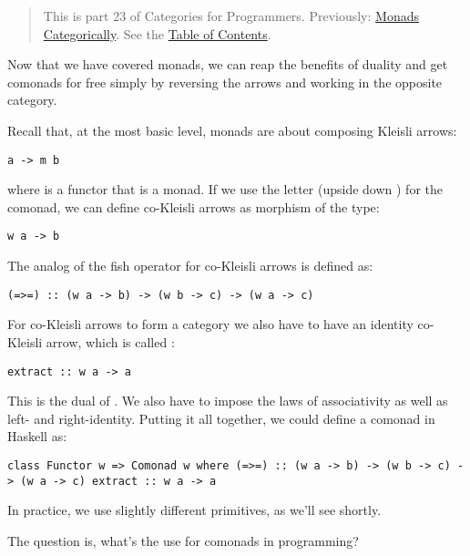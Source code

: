 \begin{quote}
This is part 23 of Categories for Programmers. Previously:
\href{https://bartoszmilewski.com/2016/12/27/monads-categorically/}{Monads
Categorically}. See the
\href{https://bartoszmilewski.com/2014/10/28/category-theory-for-programmers-the-preface/}{Table
of Contents}.
\end{quote}

Now that we have covered monads, we can reap the benefits of duality and
get comonads for free simply by reversing the arrows and working in the
opposite category.

Recall that, at the most basic level, monads are about composing Kleisli
arrows:

\begin{verbatim}
a -> m b
\end{verbatim}

where  is a functor that is a monad. If we use the letter
 (upside down ) for the comonad, we can define
co-Kleisli arrows as morphism of the type:

\begin{verbatim}
w a -> b
\end{verbatim}

The analog of the fish operator for co-Kleisli arrows is defined as:

\begin{verbatim}
(=>=) :: (w a -> b) -> (w b -> c) -> (w a -> c)
\end{verbatim}

For co-Kleisli arrows to form a category we also have to have an
identity co-Kleisli arrow, which is called :

\begin{verbatim}
extract :: w a -> a
\end{verbatim}

This is the dual of . We also have to impose the laws of
associativity as well as left- and right-identity. Putting it all
together, we could define a comonad in Haskell as:

\begin{verbatim}
class Functor w => Comonad w where (=>=) :: (w a -> b) -> (w b -> c) -> (w a -> c) extract :: w a -> a
\end{verbatim}

In practice, we use slightly different primitives, as we'll see shortly.

The question is, what's the use for comonads in programming?

